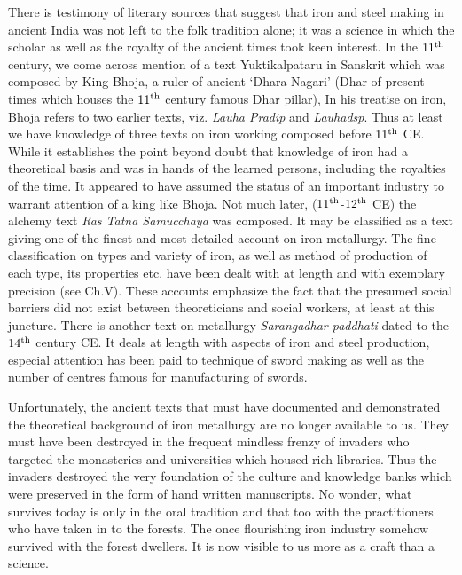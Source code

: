 There is testimony of literary sources that suggest that iron and steel making in ancient India was not left to the folk tradition alone; it was a science in which the scholar as well as the royalty of the ancient times took keen interest. In the $11^{\rm th}$ century, we come across mention of a text Yuktikalpataru in Sanskrit which was composed by King Bhoja, a ruler of ancient ‘Dhara Nagari’ (Dhar of present times which houses the $11^{\rm th}$ century famous Dhar pillar), In his treatise on iron, Bhoja refers to two earlier texts, viz. {\it Lauha Pradip} and {\it Lauhadsp}. Thus at least we have knowledge of three texts on iron working composed before $11^{\rm th}$ CE. While it establishes the point beyond doubt that knowledge of iron had a theoretical basis and was in hands of the learned persons, including the royalties of the time. It appeared to have assumed the status of an important industry to warrant attention of a king like Bhoja. Not much later, ($11^{\rm th}$-$12^{\rm th}$ CE) the alchemy text {\it Ras Tatna Samucchaya} was composed. It may be classified as a text giving one of the finest and most detailed account on iron metallurgy. The fine classification on types and variety of iron, as well as method of production of each type, its properties etc. have been dealt with at length and with exemplary precision (see Ch.V). These accounts emphasize the fact that the presumed social barriers did not exist between theoreticians and social workers, at least at this juncture. There is another text on metallurgy {\it Sarangadhar paddhati}  dated to the $14^{\rm th}$ century CE. It deals at length with aspects of iron and steel production, especial attention has been paid to technique of sword making as well as the number of centres famous for manufacturing of swords. 

Unfortunately, the ancient texts that must have documented and demonstrated the theoretical background of iron metallurgy are no longer available to us. They must have been destroyed in the frequent mindless frenzy of invaders who targeted the monasteries and universities which housed rich libraries. Thus the invaders destroyed the very foundation of the culture and knowledge banks which were preserved in the form of hand written manuscripts. No wonder, what survives today is only in the oral tradition and that too with the practitioners who have taken in to the forests. The once flourishing iron industry somehow survived with the forest dwellers. It is now visible to us more as a craft than a science.


